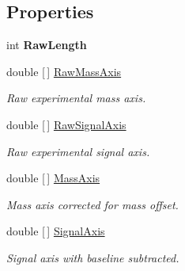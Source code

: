 \subsection*{Properties}
\begin{DoxyCompactItemize}
\item 
\mbox{\label{class_isotope_fit_1_1_i_f_data_1_1_spectrum_ae22a343962081fb1b7191f3df3634b00}} 
int {\bfseries Raw\+Length}
\item 
double \mbox{[}$\,$\mbox{]} \mbox{\hyperlink{class_isotope_fit_1_1_i_f_data_1_1_spectrum_ac3297615e23a978626e4beaf9e040e2a}{Raw\+Mass\+Axis}}
\begin{DoxyCompactList}\small\item\em Raw experimental mass axis. \end{DoxyCompactList}\item 
double \mbox{[}$\,$\mbox{]} \mbox{\hyperlink{class_isotope_fit_1_1_i_f_data_1_1_spectrum_a948927d795db6a73eb1ddeac4f294cac}{Raw\+Signal\+Axis}}
\begin{DoxyCompactList}\small\item\em Raw experimental signal axis. \end{DoxyCompactList}\item 
double \mbox{[}$\,$\mbox{]} \mbox{\hyperlink{class_isotope_fit_1_1_i_f_data_1_1_spectrum_a4ed9378cb593bfffacaa3ac4411c039d}{Mass\+Axis}}
\begin{DoxyCompactList}\small\item\em Mass axis corrected for mass offset. \end{DoxyCompactList}\item 
double \mbox{[}$\,$\mbox{]} \mbox{\hyperlink{class_isotope_fit_1_1_i_f_data_1_1_spectrum_a561e2e683aee78aed97a967a68b474e9}{Signal\+Axis}}
\begin{DoxyCompactList}\small\item\em Signal axis with baseline subtracted. \end{DoxyCompactList}\item 

\end{DoxyCompactItemize}
